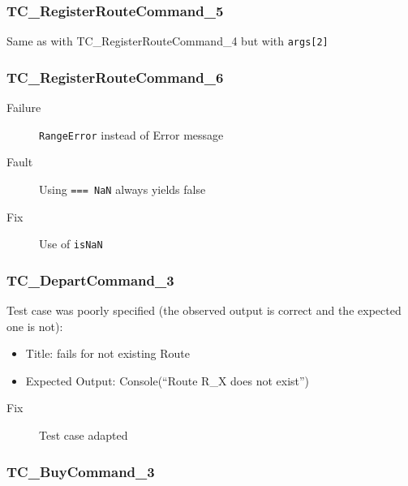 \documentclass[11pt]{article}
\begin{document}
\subsubsection{TC\_RegisterRouteCommand\_5}
\label{sec:orgee0da37}

Same as with TC\_RegisterRouteCommand\_4 but with \texttt{args[2]}

\subsubsection{TC\_RegisterRouteCommand\_6}
\label{sec:orgd54438d}

\begin{description}
\item[{Failure}] \texttt{RangeError} instead of Error message
\item[{Fault}] Using \texttt{=== NaN} always yields false
\item[{Fix}] Use of \texttt{isNaN}
\end{description}

\subsubsection{TC\_DepartCommand\_3}
\label{sec:org705fb0a}

Test case was poorly specified (the observed output is correct and the
expected one is not):
\begin{itemize}
\item Title: fails for not existing Route
\item Expected Output: Console(“Route R\_X does not exist”)
\end{itemize}


\begin{description}
\item[{Fix}] Test case adapted
\end{description}

\subsubsection{TC\_BuyCommand\_3}
\label{sec:org94b186d}
\end{document}
